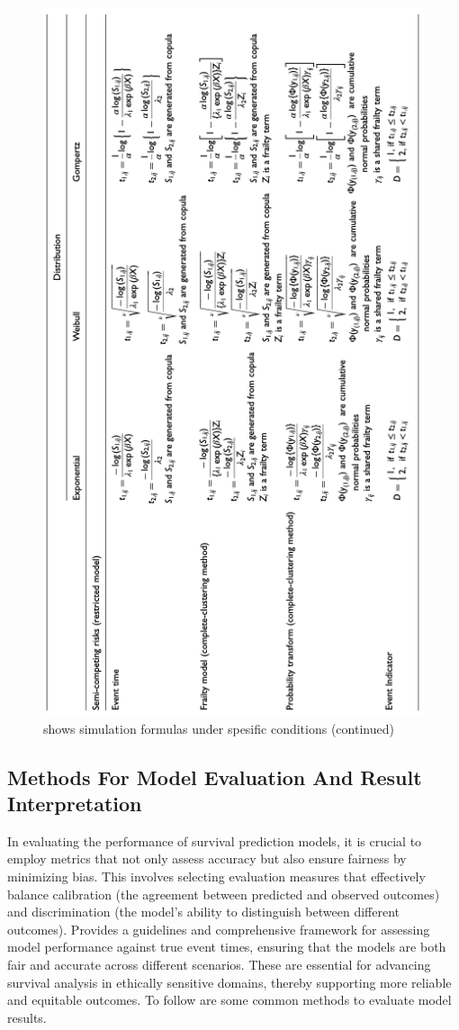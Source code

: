 \begin{figure}[h]
	\centering
	\includegraphics[scale=0.56, angle=270]{Figures/COMPETING2.png}
	\caption{\parencite{meng_simulating_2023} shows simulation formulas under spesific conditions (continued)}
\end{figure}

\subsection{Methods For Model Evaluation And Result Interpretation} \label{eval}
In evaluating the performance of survival prediction models, it is crucial to employ metrics that not only assess accuracy but also ensure fairness by minimizing bias. This involves selecting evaluation measures that effectively balance calibration (the agreement between predicted and observed outcomes) and discrimination (the model's ability to distinguish between different outcomes). \parencite{sonabend_flexible_2022} Provides a guidelines and comprehensive framework for assessing model performance against true event times, ensuring that the models are both fair and accurate across different scenarios. These are essential for advancing survival analysis in ethically sensitive domains, thereby supporting more reliable and equitable outcomes. To follow are some common methods to evaluate model results.

